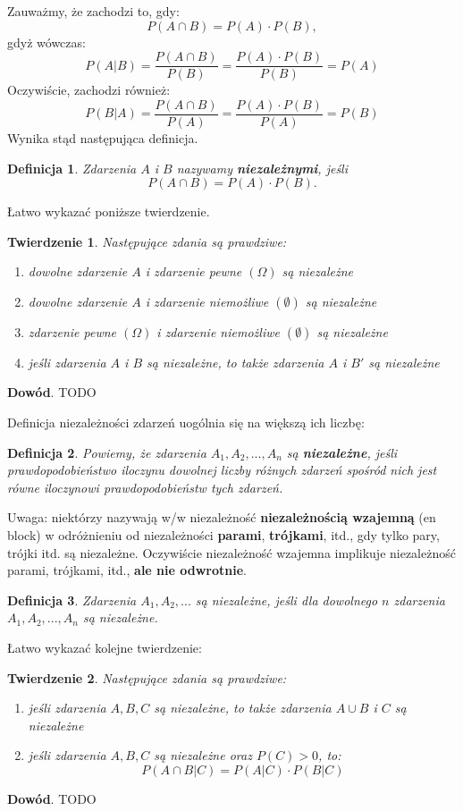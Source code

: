 \documentclass[10pt,a4paper]{article}
\newtheorem{defin}{Definicja}[section]
\newtheorem{twier}{Twierdzenie}[section]
\begin{document}
Zauważmy, że zachodzi to, gdy:
\[ P(A\cap B) = P(A)\cdot P(B),\]
gdyż wówczas:
\[ P(A|B)=\frac{P(A\cap B)}{P(B)}=\frac{P(A)\cdot P(B)}{P(B)} = P(A)\]
Oczywiście, zachodzi również:
\[ P(B|A)=\frac{P(A\cap B)}{P(A)}=\frac{P(A)\cdot P(B)}{P(A)} = P(B)\]
Wynika stąd następująca definicja.
\begin{defin}
Zdarzenia $A$ i $B$ nazywamy \textbf{niezależnymi}, jeśli 
\begin{equation}
P(A\cap B)=P(A)\cdot P(B).
\end{equation}
\end{defin}
Łatwo wykazać poniższe twierdzenie.
\begin{twier}
Następujące zdania są prawdziwe:
\begin{enumerate}
\item[1$^\circ$] dowolne zdarzenie $A$ i zdarzenie pewne $(\Omega)$ są niezależne
\item[2$^\circ$] dowolne zdarzenie $A$ i zdarzenie niemożliwe $(\emptyset)$ są niezależne
\item[3$^\circ$] zdarzenie pewne $(\Omega)$ i zdarzenie niemożliwe $(\emptyset)$ są niezależne
\item[4$^\circ$] jeśli zdarzenia $A$ i $B$ są niezależne, to także zdarzenia $A$ i $B'$ są niezależne
\end{enumerate}
\end{twier}
\textbf{Dowód}. TODO

Definicja niezależności zdarzeń uogólnia się na większą ich liczbę:
\begin{defin}
Powiemy, że zdarzenia $A_1,A_2,...,A_n$ są \textbf{niezależne}, jeśli prawdopodobieństwo iloczynu dowolnej liczby różnych zdarzeń spośród nich jest równe iloczynowi
prawdopodobieństw tych zdarzeń.
\end{defin}
Uwaga: niektórzy nazywają w/w niezależność \textbf{niezależnością wzajemną} (en block) w odróżnieniu od niezależności \textbf{parami}, \textbf{trójkami}, itd., gdy tylko
pary, trójki itd. są niezależne. Oczywiście niezależność wzajemna implikuje niezależność parami, trójkami, itd., \textbf{ale nie odwrotnie}.
\begin{defin}
Zdarzenia $A_1,A_2,...$ są niezależne, jeśli dla dowolnego $n$ zdarzenia $A_1,A_2,...,A_n$ są niezależne.
\end{defin}
Łatwo wykazać kolejne twierdzenie:
\begin{twier}
Następujące zdania są prawdziwe:
\begin{enumerate}
\item jeśli zdarzenia $A,B,C$ są niezależne, to także zdarzenia $A\cup B$ i $C$ są niezależne
\item jeśli zdarzenia $A,B,C$ są niezależne oraz $P(C)>0$, to:
\begin{equation}
P(A\cap B|C)=P(A|C)\cdot P(B|C)
\end{equation}
\end{enumerate}
\end{twier}
\textbf{Dowód}. TODO
\end{document}

